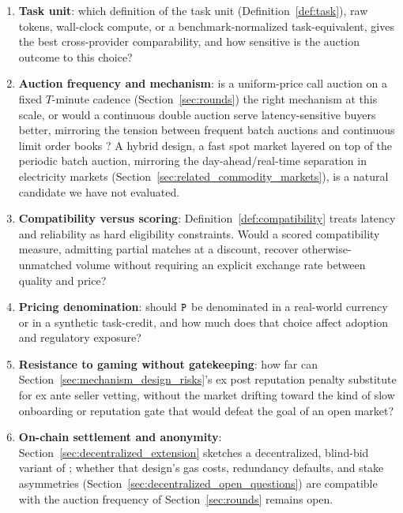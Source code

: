 \begin{enumerate}
  \item \textbf{Task unit}: which definition of the task unit
    (Definition~\ref{def:task}), raw tokens, wall-clock compute, or a
    benchmark-normalized task-equivalent, gives the best cross-provider
    comparability, and how sensitive is the auction outcome to this
    choice?

  \item \textbf{Auction frequency and mechanism}: is a uniform-price call
    auction on a fixed $T$-minute cadence
    (Section~\ref{sec:rounds}) the right mechanism at this scale, or would
    a continuous double auction serve latency-sensitive buyers better,
    mirroring the tension between frequent batch auctions and continuous
    limit order books \cite{budish2015}? A hybrid design, a fast spot
    market layered on top of the periodic batch auction, mirroring the
    day-ahead/real-time separation in electricity markets
    (Section~\ref{sec:related_commodity_markets}), is a natural candidate
    we have not evaluated.

  \item \textbf{Compatibility versus scoring}: Definition~\ref{def:compatibility}
    treats latency and reliability as hard eligibility constraints. Would
    a scored compatibility measure, admitting partial matches at a
    discount, recover otherwise-unmatched volume without requiring an
    explicit exchange rate between quality and price?

  \item \textbf{Pricing denomination}: should $\textnormal{\texttt{P}}$ be denominated
    in a real-world currency or in a synthetic task-credit, and how much
    does that choice affect adoption and regulatory exposure?

  \item \textbf{Resistance to gaming without gatekeeping}: how far can
    Section~\ref{sec:mechanism_design_risks}'s ex post reputation penalty
    substitute for ex ante seller vetting, without the market drifting
    toward the kind of slow onboarding or reputation gate that would
    defeat the goal of an open market?

  \item \textbf{On-chain settlement and anonymity}: Section~\ref{sec:decentralized_extension}
    sketches a decentralized, blind-bid variant of \NoesisMarket; whether
    that design's gas costs, redundancy defaults, and stake asymmetries
    (Section~\ref{sec:decentralized_open_questions}) are compatible with
    the auction frequency of Section~\ref{sec:rounds} remains open.
\end{enumerate}

